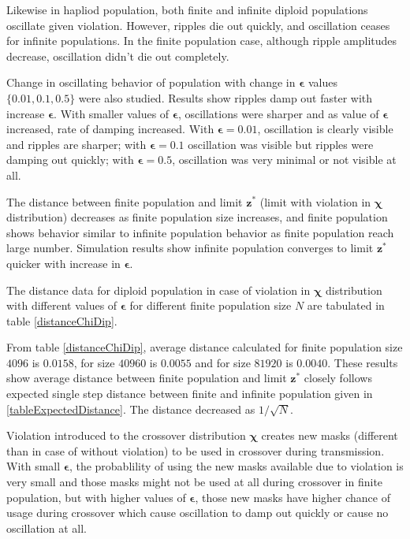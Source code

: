 Likewise in hapliod population, both finite and infinite diploid populations oscillate given violation. However, ripples die out quickly, 
and oscillation ceases for infinite populations.
In the finite population case, although ripple amplitudes decrease, oscillation didn't die out completely. 

Change in oscillating behavior of population with change in $\bm{\epsilon}$ values $\{0.01, 0.1, 0.5\}$ were also studied. 
Results show ripples damp out faster with increase $\bm{\epsilon}$.
With smaller values of $\bm{\epsilon}$, oscillations were sharper and as value of $\bm{\epsilon}$ increased, 
rate of damping increased. With $\bm{\epsilon} = 0.01$, oscillation is clearly visible and ripples are sharper; with $\bm{\epsilon} = 0.1$ oscillation was visible 
but ripples were damping out quickly;  with $\bm{\epsilon} = 0.5$, oscillation was very minimal or not visible at all. 

The distance between finite population and limit $\bm{z}^\ast$ (limit with violation in $\bm{\chi}$ distribution) decreases as finite population size increases, 
and finite population shows behavior similar to infinite population behavior as finite population reach large number. Simulation results show infinite population converges 
to limit $\bm{z^\ast}$ quicker with increase in $\bm{\epsilon}$. 

The distance data for diploid population in case of violation in $\bm{\chi}$ distribution 
with different values of $\bm{\epsilon}$ for different finite population size $N$ are tabulated in table \ref{distanceChiDip}.



From table \ref{distanceChiDip}, 
average distance calculated for finite population size $4096$ is $0.0158$, 
for size $40960$ is $0.0055$ and for size $81920$ is $0.0040$.
These results show average distance 
between finite population and limit $\bm{z^\ast}$ closely follows expected single step distance 
between finite and infinite population given in \ref{tableExpectedDistance}. The distance decreased as $1/\sqrt{N}$.

Violation introduced to the crossover distribution $\bm{\chi}$ creates new masks (different than in case of without violation) to be used in crossover 
during transmission. With small $\bm{\epsilon}$, the probablility of using the new masks available due to violation is very small and 
those masks might not be used at all during crossover in finite population, but with higher values of $\bm{\epsilon}$, 
those new masks have higher chance of usage during crossover which cause oscillation to damp out quickly or cause no oscillation at all.

